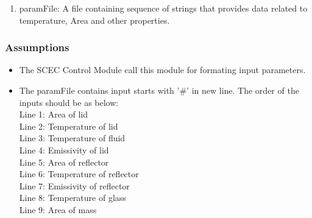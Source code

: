 \documentclass[12pt, titlepage]{article}
\begin{document}
\begin{enumerate}
    \item paramFile: A file containing sequence of strings that provides data related to temperature, Area and other properties. 
\end{enumerate}


\subsubsection{Assumptions}

\begin{itemize}
    \item The SCEC Control Module call this module for formating input parameters. 
    \item The paramFile contains input starts with '\#' in new line. The order of the inputs should be as below: \\ 
    Line 1: Area of lid \\
    Line 2: Temperature of lid \\
    Line 3: Temperature of fluid \\
    Line 4: Emissivity of lid \\
    Line 5: Area of reflector \\ 
    Line 6: Temperature of reflector \\ 
    Line 7: Emissivity of reflector \\ 
    Line 8: Temperature of glass \\
    Line 9: Area of mass 
\end{itemize}
\end{document}
